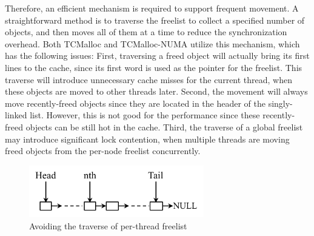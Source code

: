 Therefore, an efficient mechanism is required to support frequent movement. A straightforward method is to traverse the freelist to collect a specified number of objects, and then moves all of them at a time to reduce the synchronization overhead. Both TCMalloc and TCMalloc-NUMA utilize this mechanism, which has the following issues: First, traversing a freed object will actually bring its first lines to the cache, since its first word is used as the pointer for the freelist. This traverse will introduce unnecessary cache misses for the current thread, when these objects are moved to other threads later. 
Second, the movement will always move recently-freed objects since they are located in the header of the singly-linked list. However, this is not good for the performance since these recently-freed objects can be still hot in the cache. 
Third, the traverse of a global freelist may introduce significant lock contention, when multiple threads are moving freed objects from the per-node freelist concurrently. 
 

\begin{figure}[!h]
\centering
\includegraphics[width=3in]{figure/perthreadlist}
\caption{Avoiding the traverse of per-thread freelist\label{fig:perthreadlist}}
\end{figure}

